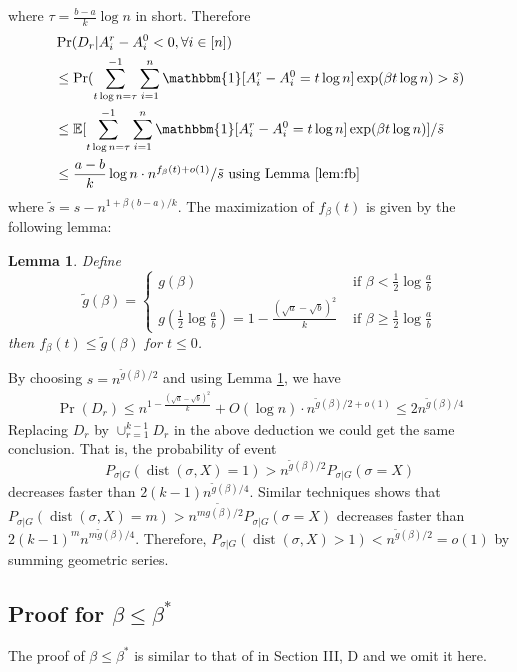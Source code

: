 \documentclass[conference]{IEEEtran}
\newtheorem{lemma}{Lemma}
\DeclareMathOperator{\dist}{dist}
\begin{document}
	where $\tau =\frac{b-a}{k}\log n$ in short. Therefore
	\begin{align*}
	&\Pr(D_r | A_i^r - A_i^0  < 0, \forall i\in [n])  \\
	&\leq\Pr(\sum_{t\log n =\tau}^{-1}\sum_{i=1}^n \mathbbm{1}[A^r_i - A^0_i = t\log n]\exp ( \beta  t\log n)  > \tilde{s} ) \\
	& \leq \mathbb{E}[\sum_{t\log n =\tau}^{-1}\sum_{i=1}^n \mathbbm{1}[A^r_i - A^0_i= t\log n]\exp ( \beta  t\log n)] /  \tilde{s} \\
	& \leq \frac{a-b}{k}\log n \cdot n^{f_{\beta}(t) + o(1)} / \tilde{s} \textrm{ using Lemma \ref{lem:fb} }
	\end{align*}
	where $\tilde{s} = s - n^{1+\beta(b-a)/k}$. 
	The maximization of $f_{\beta}(t)$ is given by the following lemma:
	\begin{lemma}\label{lem:tilde_g}
		Define
		$$
		\tilde{g}(\beta) = \begin{cases}
		g(\beta)   & \text{~if~} \beta< \frac{1}{2}\log\frac{a}{b} \\
		g(\frac{1}{2} \log\frac{a}{b}) = 1 - \frac{(\sqrt{a}-\sqrt{b})^2}{k} & \text{~if~} \beta\ge \frac{1}{2}\log\frac{a}{b}
		\end{cases}
		$$
		then $f_{\beta}(t) \leq \tilde{g}(\beta)$ for $t\leq 0$.
	\end{lemma}
	By choosing $s = n^{\tilde{g}(\beta)/2}$ and using Lemma \ref{lem:tilde_g}, we have
	\begin{align*}
	\Pr( D_r) \leq  n^{1-\frac{(\sqrt{a}-\sqrt{b})^2}{k}} + O(\log n)  \cdot n^{\tilde{g}(\beta)/2 + o(1)} \leq 2n^{\tilde{g}(\beta)/4}
	\end{align*}
	Replacing $D_r$ by $\cup_{r=1}^{k-1} D_r$ in the above deduction we could get the same conclusion.
	That is, the probability of event
	$$
	P_{\sigma | G}(\dist(\sigma, X) = 1) > n^{\tilde{g}(\beta)/2}P_{\sigma | G}(\sigma = X)\label{eq:betastar_xx}
	$$
	decreases faster than $2(k-1)n^{\tilde{g}(\beta)/4}$.
	Similar techniques shows that $P_{\sigma | G}(\dist(\sigma, X) = m)> n^{m\tilde{g(\beta)}/2}P_{\sigma | G}(\sigma = X)$
	decreases faster than $2(k-1)^m n^{m\tilde{g}(\beta)/4}$. Therefore, $P_{\sigma | G}(\dist(\sigma, X) > 1) < n^{\tilde{g}(\beta)/2} = o(1)$ by summing geometric series.
	
	\subsection{Proof for $\beta\le\beta^\ast$}\label{subsect:smaller}
	The proof of $\beta\le\beta^\ast$ is similar to that of \cite{ye2020exact} in Section III, D and we omit it here.
	
\end{document}
